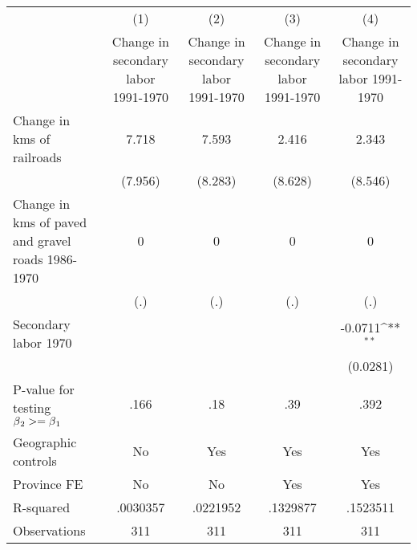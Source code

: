 {
\def\sym#1{\ifmmode^{#1}\else\(^{#1}\)\fi}
\begin{tabular}{l*{4}{c}}
\hline\hline
                &\multicolumn{1}{c}{(1)}&\multicolumn{1}{c}{(2)}&\multicolumn{1}{c}{(3)}&\multicolumn{1}{c}{(4)}\\
                &\multicolumn{1}{c}{Change in secondary labor 1991-1970}&\multicolumn{1}{c}{Change in secondary labor 1991-1970}&\multicolumn{1}{c}{Change in secondary labor 1991-1970}&\multicolumn{1}{c}{Change in secondary labor 1991-1970}\\
\hline
Change in kms of railroads&    7.718         &    7.593         &    2.416         &    2.343         \\
                &  (7.956)         &  (8.283)         &  (8.628)         &  (8.546)         \\
[1em]
Change in kms of paved and gravel roads 1986-1970&        0         &        0         &        0         &        0         \\
                &      (.)         &      (.)         &      (.)         &      (.)         \\
[1em]
Secondary labor 1970&                  &                  &                  &  -0.0711\sym{**} \\
                &                  &                  &                  & (0.0281)         \\
\hline
P-value for testing $\beta\\_2 >= \beta\\_1$&     .166         &      .18         &      .39         &     .392         \\
Geographic controls&       No         &      Yes         &      Yes         &      Yes         \\
Province FE     &       No         &       No         &      Yes         &      Yes         \\
R-squared       & .0030357         & .0221952         & .1329877         & .1523511         \\
Observations    &      311         &      311         &      311         &      311         \\
\hline\hline
\end{tabular}
}
